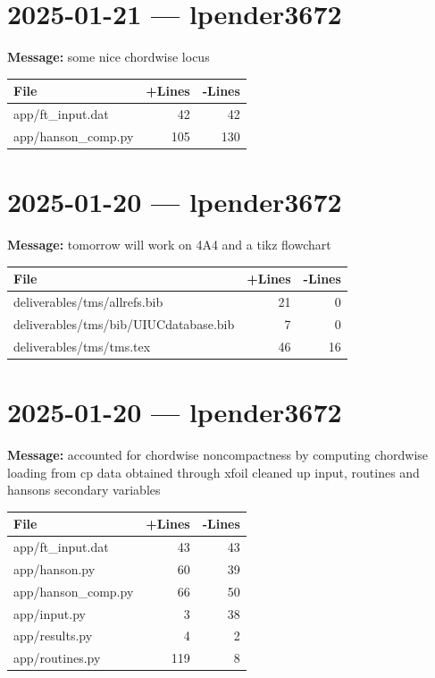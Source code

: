 \documentclass{article}
\begin{document}
\section*{2025-01-21 --- lpender3672}
\textbf{Message:} some nice chordwise locus

\begin{longtable}{|p{10cm}|r|r|}
\hline \textbf{File} & \textbf{+Lines} & \textbf{-Lines} \\
\hline
app/ft\_input.dat & 42 & 42 \\
\hline
app/hanson\_comp.py & 105 & 130 \\
\hline
\end{longtable}

\section*{2025-01-20 --- lpender3672}
\textbf{Message:} tomorrow will work on 4A4 and a tikz flowchart

\begin{longtable}{|p{10cm}|r|r|}
\hline \textbf{File} & \textbf{+Lines} & \textbf{-Lines} \\
\hline
deliverables/tms/allrefs.bib & 21 & 0 \\
\hline
deliverables/tms/bib/UIUCdatabase.bib & 7 & 0 \\
\hline
deliverables/tms/tms.tex & 46 & 16 \\
\hline
\end{longtable}

\section*{2025-01-20 --- lpender3672}
\textbf{Message:} accounted for chordwise noncompactness by computing chordwise loading from cp data obtained through xfoil cleaned up input, routines and hansons secondary variables

\begin{longtable}{|p{10cm}|r|r|}
\hline \textbf{File} & \textbf{+Lines} & \textbf{-Lines} \\
\hline
app/ft\_input.dat & 43 & 43 \\
\hline
app/hanson.py & 60 & 39 \\
\hline
app/hanson\_comp.py & 66 & 50 \\
\hline
app/input.py & 3 & 38 \\
\hline
app/results.py & 4 & 2 \\
\hline
app/routines.py & 119 & 8 \\
\hline
\end{longtable}
\end{document}
